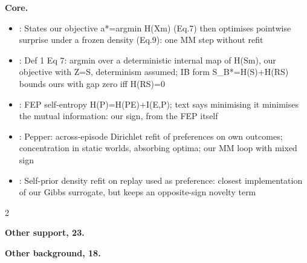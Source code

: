 \documentclass[10pt]{article}
\newcommand{\memb}[1]{\par\smallskip\textbf{#1}\quad}
\begin{document}
\memb{Core.}
\begin{itemize}[nosep,leftmargin=1.2em]
\item \citet{Friston-free12b}: States our objective a*=argmin H(X\textbar{}m) (Eq.7) then optimises pointwise surprise under a frozen density (Eq.9): one MM step without refit
\item \citet{Friston-free12c}: Def 1 Eq 7: argmin over a deterministic internal map of H(S\textbar{}m), our objective with Z=S, determinism assumed; IB form S\_B*=H(S)+H(R\textbar{}S) bounds ours with gap zero iff H(R\textbar{}S)=0
\item \citet{Friston-free19}: FEP self-entropy H(P)=H(P\textbar{}E)+I(E,P); text says minimising it minimises the mutual information: our sign, from the FEP itself
\item \citet{Sajid-exploration21}: Pepper: across-episode Dirichlet refit of preferences on own outcomes; concentration in static worlds, absorbing optima; our MM loop with mixed sign
\item \citet{Kim-emergence25}: Self-prior density refit on replay used as preference: closest implementation of our Gibbs surrogate, but keeps an opposite-sign novelty term
\end{itemize}
\begin{multicols}{2}
\memb{Other support, 23.} \citetext{\citealp{Friston-free06}; \citealp{Friston-free09}; \citealp{Friston-free10}; \citealp{Friston-what12}; \citealp{Friston-duet15}; \citealp{Friston-life13}; \citealp{Friston-knowing15}; \citealp{Friston-free23}; \citealp{Friston-path23}; \citealp{Biehl-technical21}; \citealp{Bruineberg-emperors21}; \citealp{Colombo-non21}; \citealp{Kirchhoff-universal21}; \citealp{Millidge-mathematical21}; \citealp{Aguilera-how22}; \citealp{Sajid-active22}; \citealp{Sajid-modelling22}; \citealp{Kim-active26}; \citealp{Friston-free12}; \citealp{Klein-what16}; \citealp{Baltieri-dark19}; \citealp{Seth-curious20}; \citealp{Sun-dark20}}

\memb{Other background, 18.} {\footnotesize \citetext{\citealp{Friston-free07}; \citealp{Hohwy-self14}; \citealp{Buckley-free17}; \citealp{Kirchhoff-markov18}; \citealp{Palacios-markov20}; \citealp{DaCosta-bayesian21}; \citealp{Barp-geometric22}; \citealp{Bruineberg-anticipating16}; \citealp{Colombo-first18}; \citealp{Andrews-math21}; \citealp{Friston-some21}; \citealp{Raja-markov21}; \citealp{DiPaolo-laying22}; \citealp{Friston-very22}; \citealp{Sakthivadivel-weak22}; \citealp{Clark-whatever13}; \citealp{Clark-nice18}; \citealp{VanDeCruys-controlled20}}}

\end{multicols}
\end{document}
